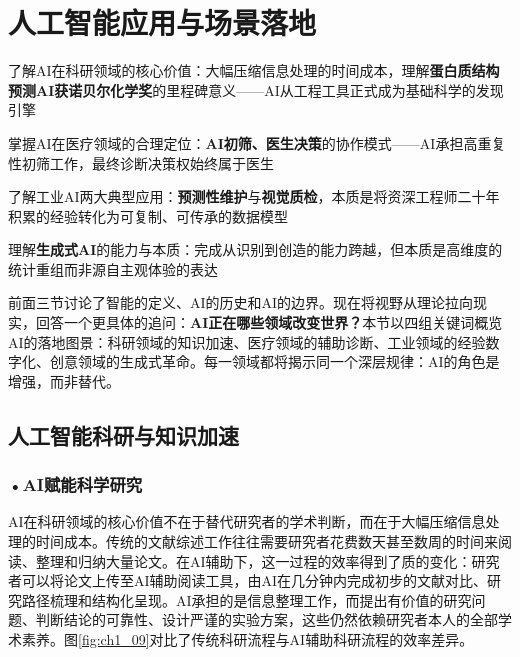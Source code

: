 \newpage

\section{人工智能应用与场景落地}

\begin{sectionkeypoints}
\item 了解AI在科研领域的核心价值：大幅压缩信息处理的时间成本，理解\textbf{蛋白质结构预测AI获诺贝尔化学奖}的里程碑意义——AI从工程工具正式成为基础科学的发现引擎
\item 掌握AI在医疗领域的合理定位：\textbf{AI初筛、医生决策}的协作模式——AI承担高重复性初筛工作，最终诊断决策权始终属于医生
\item 了解工业AI两大典型应用：\textbf{预测性维护}与\textbf{视觉质检}，本质是将资深工程师二十年积累的经验转化为可复制、可传承的数据模型
\item 理解\textbf{生成式AI}的能力与本质：完成从识别到创造的能力跨越，但本质是高维度的统计重组而非源自主观体验的表达
\end{sectionkeypoints}

前面三节讨论了智能的定义、AI的历史和AI的边界。现在将视野从理论拉向现实，回答一个更具体的追问：\textbf{AI正在哪些领域改变世界？}本节以四组关键词概览AI的落地图景：科研领域的知识加速、医疗领域的辅助诊断、工业领域的经验数字化、创意领域的生成式革命。每一领域都将揭示同一个深层规律：AI的角色是增强，而非替代。

\subsection{人工智能科研与知识加速}

\subsubsection*{\textbf{•AI赋能科学研究}}

AI在科研领域的核心价值不在于替代研究者的学术判断，而在于大幅压缩信息处理的时间成本。传统的文献综述工作往往需要研究者花费数天甚至数周的时间来阅读、整理和归纳大量论文。在AI辅助下，这一过程的效率得到了质的变化：研究者可以将论文上传至AI辅助阅读工具，由AI在几分钟内完成初步的文献对比、研究路径梳理和结构化呈现。AI承担的是信息整理工作，而提出有价值的研究问题、判断结论的可靠性、设计严谨的实验方案，这些仍然依赖研究者本人的全部学术素养。图\ref{fig:ch1_09}对比了传统科研流程与AI辅助科研流程的效率差异。

